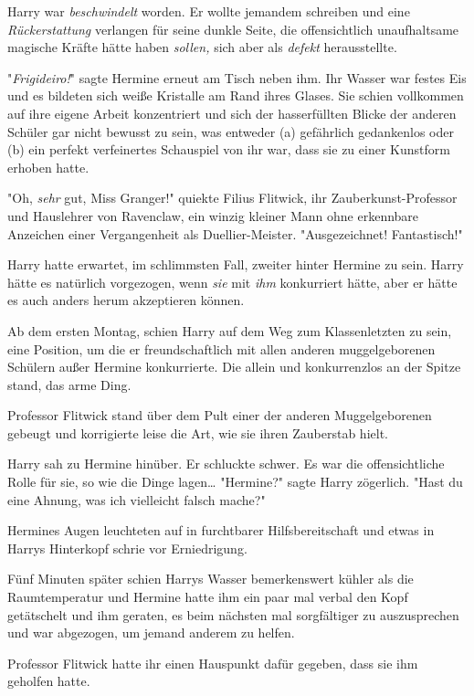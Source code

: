{Harry war \emph{beschwindelt} worden. Er wollte jemandem schreiben und eine \emph{Rückerstattung} verlangen für seine dunkle Seite, die offensichtlich unaufhaltsame magische Kräfte hätte haben \emph{sollen,} sich aber als \emph{defekt} herausstellte.

"\emph{Frigideiro!}" sagte Hermine erneut am Tisch neben ihm. Ihr Wasser war festes Eis und es bildeten sich weiße Kristalle am Rand ihres Glases. Sie schien vollkommen auf ihre eigene Arbeit konzentriert und sich der hasserfüllten Blicke der anderen Schüler gar nicht bewusst zu sein, was entweder (a) gefährlich gedankenlos oder (b) ein perfekt verfeinertes Schauspiel von ihr war, dass sie zu einer Kunstform erhoben hatte.

"Oh, \emph{sehr} gut, Miss Granger!" quiekte Filius Flitwick, ihr Zauberkunst-Professor und Hauslehrer von Ravenclaw, ein winzig kleiner Mann ohne erkennbare Anzeichen einer Vergangenheit als Duellier-Meister. "Ausgezeichnet! Fantastisch!"

Harry hatte erwartet, im schlimmsten Fall, zweiter hinter Hermine zu sein. Harry hätte es natürlich vorgezogen, wenn \emph{sie} mit \emph{ihm} konkurriert hätte, aber er hätte es auch anders herum akzeptieren können.

Ab dem ersten Montag, schien Harry auf dem Weg zum Klassenletzten zu sein, eine Position, um die er freundschaftlich mit allen anderen muggelgeborenen Schülern außer Hermine konkurrierte. Die allein und konkurrenzlos an der Spitze stand, das arme Ding.

Professor Flitwick stand über dem Pult einer der anderen Muggelgeborenen gebeugt und korrigierte leise die Art, wie sie ihren Zauberstab hielt.

Harry sah zu Hermine hinüber. Er schluckte schwer. Es war die offensichtliche Rolle für sie, so wie die Dinge lagen… "Hermine?" sagte Harry zögerlich. "Hast du eine Ahnung, was ich vielleicht falsch mache?"

Hermines Augen leuchteten auf in furchtbarer Hilfsbereitschaft und etwas in Harrys Hinterkopf schrie vor Erniedrigung.

Fünf Minuten später schien Harrys Wasser bemerkenswert kühler als die Raumtemperatur und Hermine hatte ihm ein paar mal verbal den Kopf getätschelt und ihm geraten, es beim nächsten mal sorgfältiger zu auszusprechen und war abgezogen, um jemand anderem zu helfen.

Professor Flitwick hatte ihr einen Hauspunkt dafür gegeben, dass sie ihm geholfen hatte.

}
